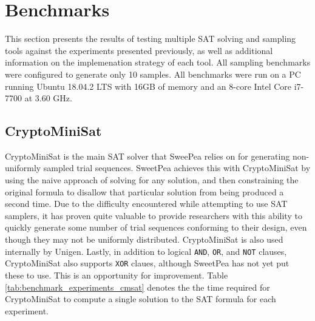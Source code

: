 

\section{Benchmarks}

This section presents the results of testing multiple SAT solving and sampling tools against the experiments presented previously, as well as additional information on the implemenation strategy of each tool. All sampling benchmarks were configured to generate only 10 samples. All benchmarks were run on a PC running Ubuntu 18.04.2 LTS with 16GB of memory and an 8-core Intel Core i7-7700 at 3.60 GHz.

\subsection{CryptoMiniSat}

CryptoMiniSat \cite{DBLP:conf/sat/SoosNC09,DBLP:conf/sat/2009} is the main SAT solver that SweePea relies on for generating non-uniformly sampled trial sequences. SweetPea achieves this with CryptoMiniSat by using the naive approach of solving for any solution, and then constraining the original formula to disallow that particular solution from being produced a second time. Due to the difficulty encountered while attempting to use SAT samplers, it has proven quite valuable to provide researchers with this ability to quickly generate some number of trial sequences conforming to their design, even though they may not be uniformly distributed. CryptoMiniSat is also used internally by Unigen. Lastly, in addition to logical \texttt{AND}, \texttt{OR}, and \texttt{NOT} clauses, CryptoMiniSat also supports \texttt{XOR} claues, although SweetPea has not yet put these to use. This is an opportunity for improvement. Table \ref{tab:benchmark_experiments_cmsat} denotes the the time required for CryptoMiniSat to compute a single solution to the SAT formula for each experiment.

